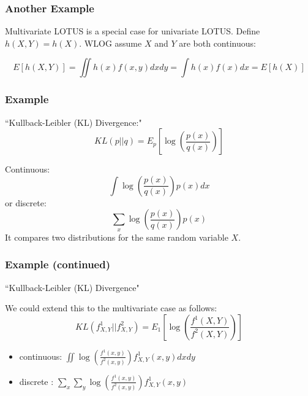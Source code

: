 \documentclass{beamer}
\begin{document}
\begin{frame}
\frametitle{Another Example}

Multivariate LOTUS is a special case for univariate LOTUS. Define $h(X,Y) = h(X)$. WLOG assume $X$ and $Y$ are both continuous:

\[
E[h(X,Y)] = \iint h(x) f(x,y)dx dy = \int h(x) f(x) dx = E[h(X)]
\]

\end{frame}
\begin{frame}
\frametitle{Example}

``Kullback-Leibler (KL) Divergence:"
\[
KL(p || q) = E_p[\log\left(\frac{p(x)}{q(x)}\right)]
\]

Continuous:
\[
\int \log\left(\frac{p(x)}{q(x)}\right)p(x) dx
\]
or discrete:
\[
\sum_x \log\left(\frac{p(x)}{q(x)}\right) p(x) 
\]
It compares two distributions for the same random variable $X$. 


\end{frame}
\begin{frame}
\frametitle{Example (continued)}

``Kullback-Leibler (KL) Divergence"

We could extend this to the multivariate case as follows:
\[
KL(f^1_{X,Y} || f^2_{X,Y}) = E_1\left[\log\left(\frac{f^1(X,Y)}{f^2(X,Y)} \right) \right] 
\]

\begin{itemize}
\item continuous: $\iint \log\left(\frac{f^1(x,y)}{f^2(x,y)} \right) f^1_{X,Y}(x,y) dx dy$
\item discrete : $\sum_x \sum_y \log\left(\frac{f^1(x,y)}{f^2(x,y)} \right) f^1_{X,Y}(x,y) $
\end{itemize}


\end{frame}
\end{document}
